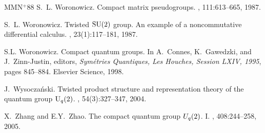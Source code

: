 \documentclass[12pt]{amsart}
\theoremstyle{definition}
\theoremstyle{remark}
\numberwithin{equation}{section}
\begin{document}
\begin{thebibliography}{MMN{{$^{{+}}$}}88}
S.~L. Woronowicz.
\newblock Compact matrix pseudogroups.
, 111:613--665, 1987.

S.~L. Woronowicz.
\newblock Twisted {${\rm SU}(2)$} group. {A}n example of a noncommutative
  differential calculus.
, 23(1):117--181, 1987.

S.L. Woronowicz.
\newblock Compact quantum groups.
\newblock In A.~Connes, K.~Gawedzki, and J.~Zinn-Justin, editors, {\em
  Sym{\'e}tries Quantiques, Les Houches, Session LXIV, 1995}, pages 845--884.
  Elsevier Science, 1998.

J.~Wysocza{\'n}ski.
\newblock Twisted product structure and representation theory of the quantum
  group {${\rm U}\sb q(2)$}.
, 54(3):327--347, 2004.

X.~Zhang and E.Y.~Zhao.
\newblock The compact quantum group {$U\sb q(2)$}. {I}.
, 408:244--258, 2005.

\end{thebibliography}
\end{document}
